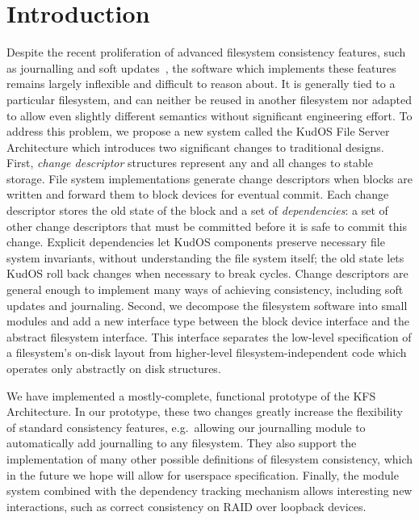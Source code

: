 \section*{Introduction}
\label{sec:intro}

Despite the recent proliferation of advanced filesystem consistency
features, such as journalling and soft updates~\cite{ganger00soft},
the software which implements these features remains largely
inflexible and difficult to reason about. It is generally tied to a
particular filesystem, and can neither be reused in another filesystem
nor adapted to allow even slightly different semantics without
significant engineering effort. To address this problem, we propose a
new system called the KudOS File Server Architecture which introduces
two significant changes to traditional designs. 
%
First, \emph{change descriptor} structures represent any and all changes to
stable storage.
%
File system implementations generate change descriptors when blocks are
written and forward them to block devices for eventual commit.
%
Each change descriptor stores the old state of the block and a set of
\emph{dependencies}: a set of other change descriptors that must be
committed before it is safe to commit this change.
%
Explicit dependencies let KudOS components preserve necessary file system
invariants, without understanding the file system itself; the old state
lets KudOS roll back changes when necessary to break cycles.
%
Change descriptors are general enough to implement many ways of achieving
consistency, including soft updates and journaling.  
%
%
%
Second,
we decompose the filesystem software into small modules and add a new
interface type between the block device interface and the abstract
filesystem interface.  This interface separates the low-level
specification of a filesystem's on-disk layout from higher-level
filesystem-independent code which operates only abstractly on disk
structures.

We have implemented a mostly-complete, functional prototype of the KFS
Architecture. In our prototype, these two changes greatly increase the
flexibility of standard consistency features, e.g.~allowing our journalling
module to automatically add journalling to any filesystem. They also support
the implementation of many other possible definitions of filesystem
consistency, which in the future we hope will allow for userspace
specification. Finally, the module system combined with the dependency
tracking mechanism allows interesting new interactions, such as correct
consistency on RAID over loopback devices.
